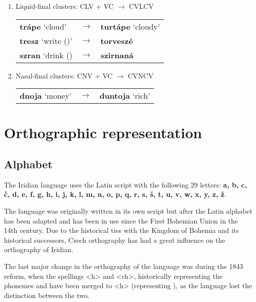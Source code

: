 \begin{enumerate}
	\item Liquid-final clusters: CLV + \glot VC $\rightarrow$ CVLCV
	\begin{center}
	\begin{tabu}to 0.8\textwidth{YM[0.1]Y}
		\textbf{trápe} `cloud'&$\rightarrow$&\textbf{turtápe} `cloudy'\\
		\textbf{tresz} `write ()'&$\rightarrow$&\textbf{torveszé}\\
		\textbf{szran} `drink () &$\rightarrow$&\textbf{szirnaná}\\
	\end{tabu}
	\end{center}

	\item Nasal-final clusters: CNV + \glot VC $\rightarrow$ CVNCV
	\begin{center}
		\begin{tabu}to 0.8\textwidth{YM[0.1]Y}
			\textbf{dnoja} `money'&$\rightarrow$&\textbf{duntoja} `rich'\\
		\end{tabu}
	\end{center}
\end{enumerate}

\section{Orthographic representation}
\subsection{Alphabet}

\par The Iridian language uses the Latin script with the following 29 letters: \textbf{a, b, c, \v{c}, d, e, f, g, h, i, j, k, l, m, n, o, p, q, r, s, \v{s}, t, u, v, w, x, y, z, \v{z}}.

The language was originally written in its own script but after the Latin alphabet has been adapted and has been in use since the First Bohemian Union in the 14th century. Due to the historical ties with the Kingdom of Bohemia and its historical successors, Czech orthography has had a great influence on the orthography of Iridian.

The last major change in the orthography of the language was during the 1843 reform, when the spellings <h> and <ch>, historically representing the phonemes  and  have been merged to <h> (representing ), as the language lost the distinction between the two.

